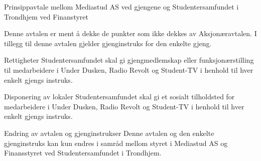 \begin{instruks*}{Prinsippavtale mellom Mediastud AS ved gjengene og Studentersamfundet i Trondhjem ved 
    Finanstyret}  

        Denne avtalen er ment å dekke de punkter som ikke dekkes av Aksjonæravtalen. I tillegg til denne 
avtalen gjelder gjenginstruks for den enkelte gjeng.

    \begin{instruksledd}{Rettigheter}
	Studentersamfundet skal gi gjengmedlemskap eller funksjonærstilling til medarbeidere i Under Dusken, 
	Radio Revolt og Student-TV i henhold til hver enkelt gjengs instruks.      
    \end{instruksledd}

    \begin{instruksledd}{Disponering av lokaler}
	Studentersamfundet skal gi et sosialt tilholdsted for medarbeidere i Under Dusken, Radio Revolt og 
	Student-TV i henhold til hver enkelt gjengs instruks.
    \end{instruksledd}        

    \begin{instruksledd}{Endring av avtalen og gjenginstrukser}
        Denne avtalen og den enkelte gjenginstruks kan kun endres i samråd mellom styret i Mediastud AS og 
	Finansstyret ved Studentersamfundet i Trondhjem.
    \end{instruksledd}


\end{instruks*}


